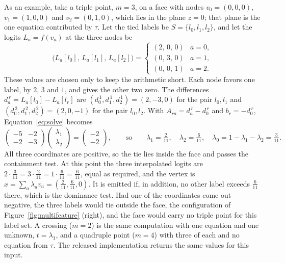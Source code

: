 \documentclass[11pt]{article}
\theoremstyle{definition}
\newcommand{\tet}{\tau}
\begin{document}
As an example, take a triple point, $m = 3$, on a face with nodes
$v_0 = (0,0,0)$, $v_1 = (1,0,0)$ and $v_2 = (0,1,0)$, which lies in the plane
$z=0$; that plane is the one equation contributed by $\tet$. Let the tied
labels be $S = \{l_0, l_1, l_2\}$, and let the logits $L_a = f(v_a)$ at the
three nodes be
\[
\big(L_a[l_0],\, L_a[l_1],\, L_a[l_2]\big) =
\begin{cases}
(2,\, 0,\, 0) & a = 0,\\
(0,\, 3,\, 0) & a = 1,\\
(0,\, 0,\, 1) & a = 2.
\end{cases}
\]
These values are chosen only to keep the arithmetic short. Each node favors
one label, by $2$, $3$ and $1$, and gives the other two zero.
The differences $d_a^{\,r} = L_a[l_0] - L_a[l_r]$ are
$(d_0^{\,1}, d_1^{\,1}, d_2^{\,1}) = (2, -3, 0)$ for the pair $l_0, l_1$ and
$(d_0^{\,2}, d_1^{\,2}, d_2^{\,2}) = (2, 0, -1)$ for the pair $l_0, l_2$.
With $A_{ra} = d_a^{\,r} - d_0^{\,r}$ and $b_r = -d_0^{\,r}$,
Equation~\eqref{eq:solve} becomes
\[
\begin{pmatrix} -5 & -2 \\ -2 & -3 \end{pmatrix}
\begin{pmatrix} \lambda_1 \\ \lambda_2 \end{pmatrix}
=
\begin{pmatrix} -2 \\ -2 \end{pmatrix},
\qquad\text{so}\qquad
\lambda_1 = \tfrac{2}{11},\quad \lambda_2 = \tfrac{6}{11},\quad
\lambda_0 = 1 - \lambda_1 - \lambda_2 = \tfrac{3}{11}.
\]
All three coordinates are positive, so the tie lies inside the face and passes
the containment test. At this point the three interpolated logits are
$2\cdot\tfrac{3}{11} = 3\cdot\tfrac{2}{11} = 1\cdot\tfrac{6}{11} = \tfrac{6}{11}$,
equal as required, and the vertex is
$x = \sum_a \lambda_a v_a = (\tfrac{2}{11}, \tfrac{6}{11}, 0)$. It is emitted
if, in addition, no other label exceeds $\tfrac{6}{11}$ there, which is the
dominance test. Had one of the coordinates come out negative, the three labels
would tie outside the face, the configuration of
Figure~\ref{fig:multifeature} (right), and the face would carry no triple
point for this label set. A crossing ($m=2$) is the same computation with one
equation and one unknown, $t = \lambda_1$, and a quadruple point ($m=4$) with
three of each and no equation from $\tet$. The released implementation returns
the same values for this input.
\end{document}
